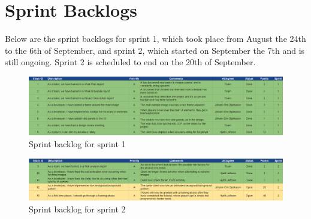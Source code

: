 \section{Sprint Backlogs}\label{sec:backlog}

Below are the sprint backlogs for sprint 1, which took place from August the 24th to the 6th of September, and sprint 2, which started on September the 7th and is still ongoing. Sprint 2 is scheduled to end on the 20th of September.

\begin{figure}[H]
	\centering

    \centerline{\includegraphics[scale=0.45]{s1.png}}
    \caption{\label{fig:s1}Sprint backlog for sprint 1}
\end{figure}

\begin{figure}[H]
	\centering

    \centerline{\includegraphics[scale=0.45]{s2.png}}
    \caption{\label{fig:s2}Sprint backlog for sprint 2}
\end{figure}